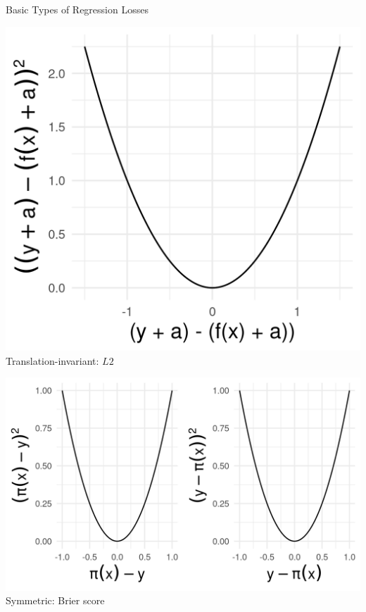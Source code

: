 \documentclass[11pt,compress,t,notes=noshow, xcolor=table]{beamer}
\begin{document}
\begin{vbframe}{Basic Types of Regression Losses}
\begin{minipage}[b]{0.2\textwidth}
  \includegraphics[width=\textwidth]{figure/loss_transl_inv.png}
  \tiny \centering
  Translation-invariant: $L2$
\end{minipage}%
\begin{minipage}[b]{0.3\textwidth}
  \includegraphics[width=\textwidth]{figure/loss_symmetric}
  \tiny \centering
  Symmetric: Brier score
\end{minipage}

\end{vbframe}

\end{document}
